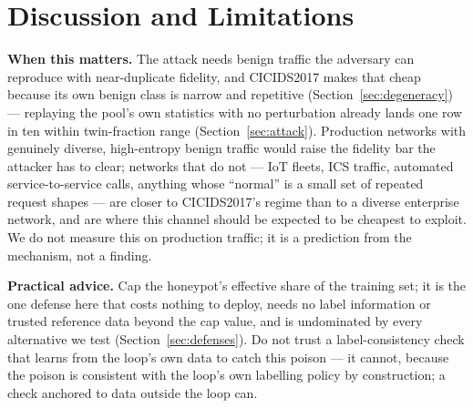 \section{Discussion and Limitations}
\label{sec:discussion}

\textbf{When this matters.} The attack needs benign traffic the adversary can reproduce with
near-duplicate fidelity, and CICIDS2017 makes that cheap because its own benign class is narrow
and repetitive (Section~\ref{sec:degeneracy}) — replaying the pool's own statistics with no
perturbation already lands one row in ten within twin-fraction range
(Section~\ref{sec:attack}). Production networks with genuinely diverse, high-entropy benign
traffic would raise the fidelity bar the attacker has to clear; networks that do not — IoT
fleets, ICS traffic, automated service-to-service calls, anything whose “normal” is a small set
of repeated request shapes — are closer to CICIDS2017's regime than to a diverse enterprise
network, and are where this channel should be expected to be cheapest to exploit. We do not
measure this on production traffic; it is a prediction from the mechanism, not a finding.

\textbf{Practical advice.} Cap the honeypot's effective share of the training set; it is the one
defense here that costs nothing to deploy, needs no label information or trusted reference data
beyond the cap value, and is undominated by every alternative we test
(Section~\ref{sec:defenses}). Do not trust a label-consistency check that learns from the loop's
own data to catch this poison — it cannot, because the poison is consistent with the loop's own
labelling policy by construction; a check anchored to data outside the loop can.

